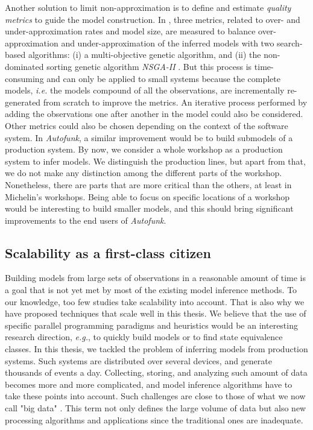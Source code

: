 Another solution to limit non-approximation is to define and
estimate \emph{quality metrics}
\cite{tonella2012finding,Lo20122063} to guide the model
construction. In \cite{tonella2012finding}, three metrics,
related to over- and under-approximation rates and model size,
are measured to balance over-approximation and
under-approximation of the inferred models with two search-based
algorithms: (i) a multi-objective genetic algorithm, and (ii) the
non-dominated sorting genetic algorithm \textit{NSGA-II}
\cite{deb2002fast}. But this process is time-consuming and can
only be applied to small systems because the complete models,
\emph{i.e.} the models compound of all the observations, are
incrementally re-generated from scratch to improve the metrics.
An iterative process performed by adding the observations one
after another in the model could also be considered. Other
metrics could also be chosen depending on the context of the
software system. In \textit{Autofunk}, a similar improvement
would be to build submodels of a production system. By now, we
consider a whole workshop as a production system to infer models.
We distinguish the production lines, but apart from that, we do
not make any distinction among the different parts of the
workshop.  Nonetheless, there are parts that are more critical
than the others, at least in Michelin's workshops. Being able to
focus on specific locations of a workshop would be interesting to
build smaller models, and this should bring significant
improvements to the end users of \textit{Autofunk}.

\subsection{Scalability as a first-class citizen}

Building models from large sets of observations in a reasonable
amount of time is a goal that is not yet met by most of the
existing model inference methods. To our knowledge, too few
studies \cite{Yang:2006:PMT:1134285.1134325,Pradel:2009} take
scalability into account. That is also why we have proposed
techniques that scale well in this thesis. We believe that the
use of specific parallel programming paradigms and heuristics
would be an interesting research direction, \emph{e.g.}, to
quickly build models or to find state equivalence classes. In
this thesis, we tackled the problem of inferring models from
production systems.  Such systems are distributed over several
devices, and generate thousands of events a day. Collecting,
storing, and analyzing such amount of data becomes more and more
complicated, and model inference algorithms have to take these
points into account. Such challenges are close to those of what
we now call "big data" \cite{bigdata14}. This term not only
defines the large volume of data but also new processing
algorithms and applications since the traditional ones are
inadequate.

